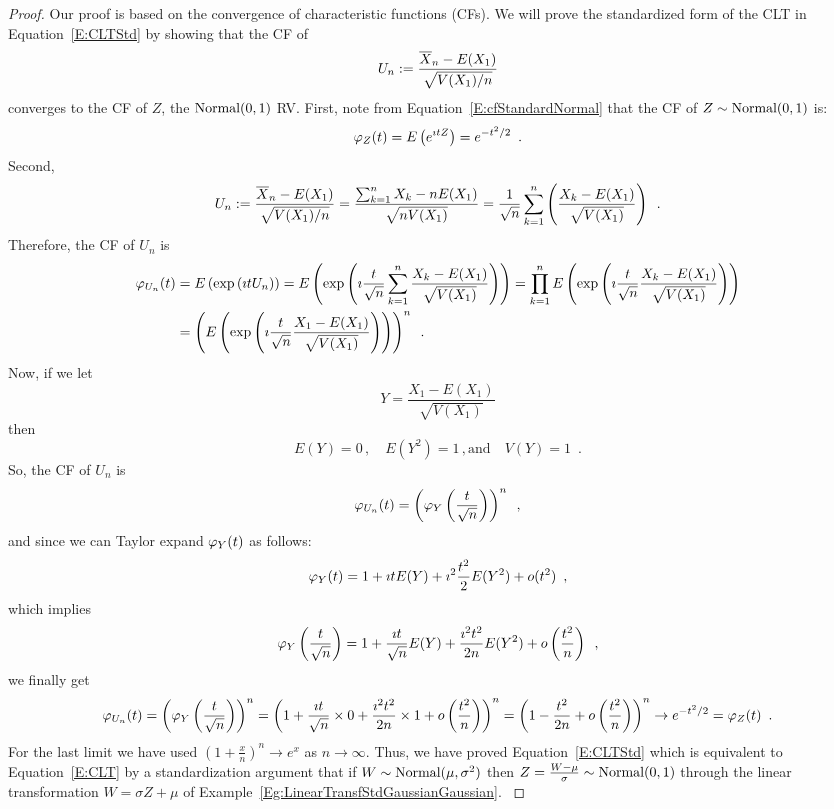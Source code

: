 \begin{prop}
{\normalsize
\begin{proof}
{
Our proof is based on the convergence of characteristic functions (CFs).  
We will prove the standardized form of the CLT in Equation~\eqref{E:CLTStd} by showing that the CF of
\[
U_n := \frac{\overline{X}_n-E(X_1)}{\sqrt{V(X_1)/n}}
\]
converges to the CF of $Z$, the $\mbox{{\rm Normal}}(0,1)$ RV.  
First, note from Equation~\eqref{E:cfStandardNormal} that the CF of $Z \sim \mbox{{\rm Normal}}(0,1)$ is:
\[
\varphi_Z(t) = E \left( e^{\imath t Z}\right) = e^{-t^2/2} \enspace .
\]
Second, 
\[
U_n := \frac{\overline{X}_n-E(X_1)}{\sqrt{V(X_1)/n}} 
= \frac{\sum_{k=1}^n X_k - n E(X_1)}{\sqrt{nV(X_1)}}
= \frac{1}{\sqrt{n}} \sum_{k=1}^n \left(\frac{X_k - E(X_1)}{\sqrt{V(X_1)}}\right)\enspace .
\]
Therefore, the CF of $U_n$ is
\begin{align*}
\varphi_{U_n}(t) 
&= E\left( \exp\left({\imath t U_n}\right)\right)
= E \left( \exp\left({\imath \frac{t}{\sqrt{n}}\sum_{k=1}^n \frac{X_k - E(X_1)}{\sqrt{V(X_1)}} }\right)\right)
= \prod_{k=1}^n E \left( \exp \left( \imath \frac{t}{\sqrt{n}} \frac{X_k - E(X_1)}{\sqrt{V(X_1)}} \right) \right)\\
&= \left( E \left( \exp \left( \imath \frac{t}{\sqrt{n}} \frac{X_1 - E(X_1)}{\sqrt{V(X_1)}} \right) \right)\right)^n \enspace .
\end{align*}
Now, if we let
\[
Y = \frac{X_1 - E(X_1)}{\sqrt{V(X_1)}}
\]
then 
\[
E(Y) = 0 \, , \quad E(Y^2)=1 \, , \text{and} \quad V(Y)=1 \enspace . 
\]
So, the CF of $U_n$ is
\[
\varphi_{U_n}(t) = \left( \varphi_Y\left(\frac{t}{\sqrt{n}}\right)\right)^n \enspace ,
\]
and since we can Taylor expand $\varphi_Y(t)$ as follows: 
\[
\varphi_Y(t) = 1 + \imath t E(Y) + \imath^2 \frac{t^2}{2} E(Y^2) + o(t^2) \enspace,
\]
which implies
\[
\varphi_Y\left(\frac{t}{\sqrt{n}}\right) = 1 + \frac{\imath t}{\sqrt{n}} E(Y) + \frac{\imath^2 t^2}{2n}  E(Y^2) + o\left(\frac{t^2}{n}\right) \enspace,
\]
we finally get
\[
\varphi_{U_n}(t) 
= \left( \varphi_Y \left(\frac{t}{\sqrt{n}}\right) \right)^n
= \left( 1 +  \frac{\imath t}{\sqrt{n}} \times 0 + \frac{\imath^2 t^2}{2n}  \times 1 + o\left(\frac{t^2}{n}\right) \right)^n
= \left( 1 - \frac{t^2}{2n} + o\left(\frac{t^2}{n}\right) \right)^n
\to e^{-t^2/2} = \varphi_Z(t) \enspace .
\]
For the last limit we have used $\left( 1+\frac{x}{n}\right)^n \to e^x$ as $n \to \infty$.  
Thus, we have proved Equation~\eqref{E:CLTStd} which is equivalent to Equation~\eqref{E:CLT} by a standardization argument that if $W \sim \mbox{{\rm Normal}}(\mu,\sigma^2)$ then $Z=\frac{W-\mu}{\sigma} \sim \mbox{{\rm Normal}}(0,1)$ through the linear transformation $W=\sigma Z + \mu$ of Example~\ref{Eg:LinearTransfStdGaussianGaussian}.
}
\end{proof}
}
\end{prop}


